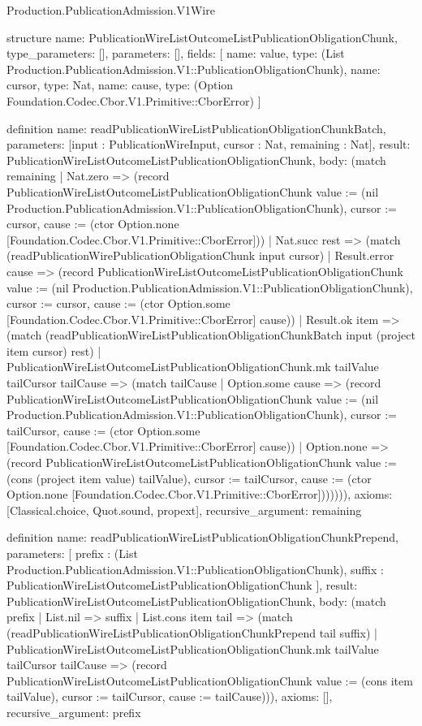 \begin{lexlean}{Production.PublicationAdmission.V1Wire}
\begin{semanticmodule}
structure{
  name: PublicationWireListOutcomeListPublicationObligationChunk,
  type_parameters: [],
  parameters: [],
  fields: [
    {name: value, type: (List Production.PublicationAdmission.V1::PublicationObligationChunk)},
    {name: cursor, type: Nat},
    {name: cause, type: (Option Foundation.Codec.Cbor.V1.Primitive::CborError)}
  ]
}

definition{
  name: readPublicationWireListPublicationObligationChunkBatch,
  parameters: [input : PublicationWireInput, cursor : Nat, remaining : Nat],
  result: PublicationWireListOutcomeListPublicationObligationChunk,
  body: (match remaining
    | Nat.zero => (record PublicationWireListOutcomeListPublicationObligationChunk {value := (nil Production.PublicationAdmission.V1::PublicationObligationChunk), cursor := cursor, cause := (ctor Option.none [Foundation.Codec.Cbor.V1.Primitive::CborError])})
    | Nat.succ rest => (match (readPublicationWirePublicationObligationChunk input cursor)
      | Result.error cause => (record PublicationWireListOutcomeListPublicationObligationChunk {value := (nil Production.PublicationAdmission.V1::PublicationObligationChunk), cursor := cursor, cause := (ctor Option.some [Foundation.Codec.Cbor.V1.Primitive::CborError] cause)})
      | Result.ok item => (match (readPublicationWireListPublicationObligationChunkBatch input (project item cursor) rest)
        | PublicationWireListOutcomeListPublicationObligationChunk.mk tailValue tailCursor tailCause => (match tailCause
          | Option.some cause => (record PublicationWireListOutcomeListPublicationObligationChunk {value := (nil Production.PublicationAdmission.V1::PublicationObligationChunk), cursor := tailCursor, cause := (ctor Option.some [Foundation.Codec.Cbor.V1.Primitive::CborError] cause)})
          | Option.none => (record PublicationWireListOutcomeListPublicationObligationChunk {value := (cons (project item value) tailValue), cursor := tailCursor, cause := (ctor Option.none [Foundation.Codec.Cbor.V1.Primitive::CborError])}))))),
  axioms: [Classical.choice, Quot.sound, propext],
  recursive_argument: remaining
}

definition{
  name: readPublicationWireListPublicationObligationChunkPrepend,
  parameters: [
    prefix : (List Production.PublicationAdmission.V1::PublicationObligationChunk),
    suffix : PublicationWireListOutcomeListPublicationObligationChunk
  ],
  result: PublicationWireListOutcomeListPublicationObligationChunk,
  body: (match prefix
    | List.nil => suffix
    | List.cons item tail => (match (readPublicationWireListPublicationObligationChunkPrepend tail suffix)
      | PublicationWireListOutcomeListPublicationObligationChunk.mk tailValue tailCursor tailCause => (record PublicationWireListOutcomeListPublicationObligationChunk {value := (cons item tailValue), cursor := tailCursor, cause := tailCause}))),
  axioms: [],
  recursive_argument: prefix
}


\end{semanticmodule}
\end{lexlean}

